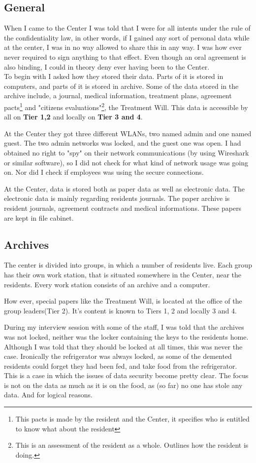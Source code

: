 \documentclass[11pt]{article}
\begin{document}
\subsection{General}
When I came to the Center I was told that I were for all intents under the rule of the confidentiality law, in other words, if I gained any sort of personal data while at the center, I was in no way allowed to share this in any way. I was how ever never required to sign anything to that effect. Even though an oral agreement is also binding, I could in theory deny ever having been to the Center.\\
To begin with I asked how they stored their data. Parts of it is stored in computers, and parts of it is stored in archive. Some of the data stored in the archive include, a journal, medical information, treatment plans, agreement pacts\footnote{This pacts is made by the resident and the Center, it specifies who is entitled to know what about the resident} and "citizens evaluations"\footnote{This is an assessment of the resident as a whole. Outlines how the resident is doing.}, the Treatment Will. This data is accessible by all on \textbf{Tier 1,2} and locally on \textbf{Tier 3 and 4}.

At the Center they got three different WLANs, two named admin and one named guest. The two admin networks was locked, and the guest one was open. I had obtained no right to "spy" on their network communications (by using Wireshark or similar software), so I did not check for what kind of network usage was going on. Nor did I check if employees was using the secure connections.

At the Center, data is stored both as paper data as well as electronic data. The electronic data is mainly regarding residents journals. The paper archive is resident journals, agreement contracts and medical informations. These papers are kept in file cabinet.
\subsection{Archives}
The center is divided into groups, in which a number of residents live. Each group has their own work station, that is situated somewhere in the Center, near the residents. Every work station consists of an archive and a computer.

How ever, special papers like the Treatment Will, is located at the office of the group leaders(Tier 2). It's content is known to Tiers 1, 2 and locally 3 and 4.

During my interview session with some of the staff, I was told that the archives was not locked, neither was the locker containing the keys to the residents home. Although I was told that they should be locked at all times, this was never the case. Ironically the refrigerator was always locked, as some of the demented residents could forget they had been fed, and take food from the refrigerator.
This is a case in which the issues of data security become pretty clear. The focus is not on the data as much as it is on the food, as (so far) no one has stole any data. And for logical reasons.
\end{document}
